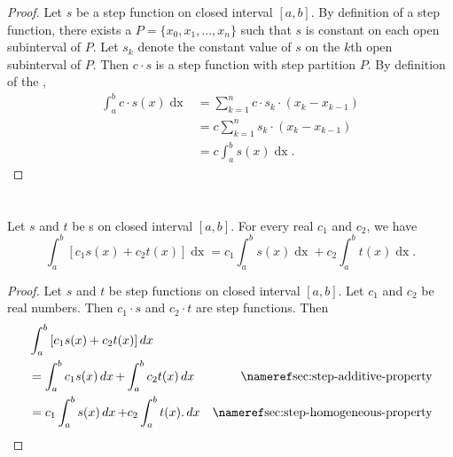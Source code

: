\documentclass{report}
\begin{document}
\begin{proof}

  Let $s$ be a step function on closed interval $[a, b]$.
  By definition of a step function, there exists a 
    $P = \{x_0, x_1, \ldots, x_n\}$ such that $s$ is constant on each open
    subinterval of $P$.
  Let $s_k$ denote the constant value of $s$ on the $k$th open subinterval of
    $P$.
  Then $c \cdot s$ is a step function with step partition $P$.
  By definition of the ,
    \begin{align*}
      \int_a^b c \cdot s(x) \mathop{dx}
        & = \sum_{k=1}^n c \cdot s_k \cdot (x_k - x_{k-1}) \\
        & = c \sum_{k=1}^n s_k \cdot (x_k - x_{k-1}) \\
        & = c \int_a^b s(x) \mathop{dx}.
    \end{align*}

\end{proof}

\section{}%
\label{sec:step-linearity-property}
\label{sec:theorem-1.4}

\begin{theorem}[1.4]

  Let $s$ and $t$ be s on closed interval
    $[a, b]$.
  For every real $c_1$ and $c_2$, we have
    $$\int_a^b \left[ c_1s(x) + c_2t(x) \right] \mathop{dx} =
      c_1\int_a^b s(x) \mathop{dx} + c_2\int_a^b t(x) \mathop{dx}.$$

\end{theorem}

\begin{proof}

  Let $s$ and $t$ be step functions on closed interval $[a, b]$.
  Let $c_1$ and $c_2$ be real numbers.
  Then $c_1 \cdot s$ and $c_2 \cdot t$ are step functions.
  Then
    \begin{align*}
      & \int_a^b \left[ c_1s(x) + c_2t(x) \right] \mathop{dx} \\
      & = \int_a^b c_1s(x) \mathop{dx} + \int_a^b c_2t(x) \mathop{dx}
        & \textref{sec:step-additive-property} \\
      & = c_1\int_a^b s(x) \mathop{dx} + c_2\int_a^b t(x). \mathop{dx}
        & \textref{sec:step-homogeneous-property}
    \end{align*}

\end{proof}
\end{document}
